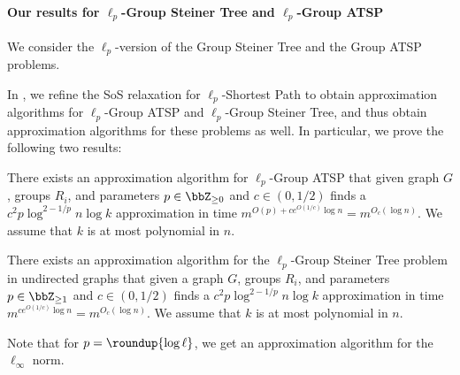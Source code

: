\documentclass[11pt,a4paper]{article}
\begin{document}

\paragraph{Our results for $\ell_p$-Group Steiner Tree and $\ell_p$-Group ATSP} We consider the $\ell_p$-version of the Group Steiner Tree and the Group ATSP problems.

In , we refine the SoS relaxation for $\ell_p$-Shortest Path to obtain approximation algorithms for $\ell_p$-Group ATSP and $\ell_p$-Group Steiner Tree, and thus obtain approximation algorithms for these problems as well. In particular, we prove the following two results:

\begin{theorem}\label{thm:intro-atsp-guarantees}  
There exists an approximation algorithm for $\ell_p$-Group ATSP that given graph $G$, groups $R_i$, and parameters $p\in\bbZ_{\geq 0}$ and $c\in(0,1/2)$ finds a $c^2 p  \log^{2-1/p} n \log k$ approximation in time $m^{O(p)+ce^{O(1/c)} \log n}= m^{O_c(\log n)}$. We assume that $k$ is at most polynomial in $n$. 
\end{theorem}

\begin{theorem}\label{thm:intro-steiner-tree-guarantees}
There exists an approximation algorithm for
    the $\ell_p$-Group Steiner Tree problem in undirected graphs that given a graph $G$, groups $R_i$, and parameters $p\in\bbZ_{\geq 1}$ and $c\in(0,1/2)$ finds a $c^2 p  \log^{2-1/p} n \log k$ approximation in time $m^{c e^{O(1/c)} \log n}=m^{O_c(\log n)}$. We assume that  $k$ is at most polynomial in $n$. 
\end{theorem}
Note that for $p=\roundup{\log \ell}$, we get an approximation algorithm for the $\ell_\infty$ norm.
\end{document}
